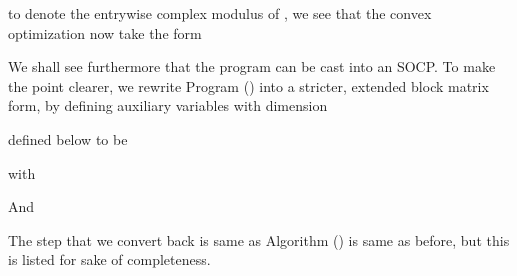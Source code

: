 
to denote the entrywise complex modulus of , we see that the convex optimization now take the form

\stopsection

\startsection [title={Second Order Cone Programming}]

We shall see furthermore that the program can be cast into an SOCP.
To make the point clearer, we rewrite Program () into a stricter, extended block matrix form, by defining auxiliary variables with dimension


defined below to be


with


And


The step that we convert  back is same as Algorithm () is same as before, but this is listed for sake of completeness.

